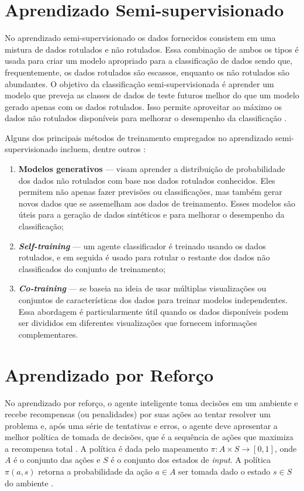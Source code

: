 \documentclass[
	12pt,				%
	openright,			%
	oneside,			%
	a4paper,			%
	tccpreliminar,			%
	]{ABNT-DC-UEL}
\begin{document}
\section{Aprendizado Semi-supervisionado}

No aprendizado semi-supervisionado os dados fornecidos consistem em uma mistura de dados rotulados e não rotulados. Essa combinação de ambos os tipos é usada para criar um modelo apropriado para a classificação de dados sendo que, frequentemente, os dados rotulados são escassos, enquanto os não rotulados são abundantes. O objetivo da classificação semi-supervisionada é aprender um modelo que preveja as classes de dados de teste futuros melhor do que um modelo gerado apenas com os dados rotulados. Isso permite aproveitar ao máximo os dados não rotulados disponíveis para melhorar o desempenho da classificação \cite{mohammed:16}.

Alguns dos principais métodos de treinamento empregados no aprendizado semi-supervisionado incluem, dentre outros \cite{prakash:14, vanengelen:20}: 

\begin{enumerate}
    \item \textbf{Modelos generativos} --- visam aprender a distribuição de probabilidade dos dados não rotulados com base nos dados rotulados conhecidos. Eles permitem não apenas fazer previsões ou classificações, mas também gerar novos dados que se assemelham aos dados de treinamento. Esses modelos são úteis para a geração de dados sintéticos e para melhorar o desempenho da classificação;
    \item \textit{\textbf{Self-training}} --- um agente classificador é treinado usando os dados rotulados, e em seguida é usado para rotular o restante dos dados não classificados do conjunto de treinamento;
    \item \textit{\textbf{Co-training}} --- se baseia na ideia de usar múltiplas visualizações ou conjuntos de características dos dados para treinar modelos independentes. Essa abordagem é particularmente útil quando os dados disponíveis podem ser divididos em diferentes visualizações que fornecem informações complementares.
\end{enumerate}

\section{Aprendizado por Reforço}

No aprendizado por reforço, o agente inteligente toma decisões em um ambiente e recebe recompensas (ou penalidades) por suas ações ao tentar resolver um problema e, após uma série de tentativas e erros, o agente deve apresentar a melhor política de tomada de decisões, que é a sequência de ações que maximiza a recompensa total \cite{alpaydin:20}. A política é dada pelo mapeamento $\pi : A \times S \to [0,1]$, onde $A$ é o conjunto das ações e $S$ é o conjunto dos estados de \textit{input}. A política $\pi(a,s)$ retorna a probabilidade da ação $a \in A$ ser tomada dado o estado $s \in S$ do ambiente \cite{kaelbiling:96}.
\end{document}
